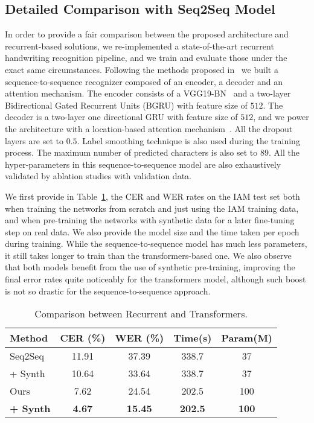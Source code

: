 \documentclass[10pt,twocolumn,letterpaper]{article}
\begin{document}
\subsection{Detailed Comparison with Seq2Seq Model}
\label{sec:adv_s2s}
In order to provide a fair comparison between the proposed architecture and recurrent-based solutions, we re-implemented a state-of-the-art recurrent handwriting recognition pipeline, and we train and evaluate those under the exact same circumstances. Following the methods proposed in~\cite{kang2018convolve,michael2019evaluating} we built a sequence-to-sequence recognizer composed of an encoder, a decoder and an attention mechanism. The encoder consists of a VGG19-BN~\cite{simonyan2014very} and a two-layer Bidirectional Gated Recurrent Units (BGRU) with feature size of $512$. The decoder is a two-layer one directional GRU with feature size of $512$, and we power the architecture with a location-based attention mechanism~\cite{chorowski2015attention}. All the dropout layers are set to $0.5$. Label smoothing technique is also used during the training process. The maximum number of predicted characters is also set to $89$. All the hyper-parameters in this sequence-to-sequence model are also exhaustively validated by ablation studies with validation data.

We first provide in Table~\ref{tab:comp}, the CER and WER rates on the IAM test set both when training the networks from scratch and just using the IAM training data, and when pre-training the networks with synthetic data for a later fine-tuning step on real data. We also provide the model size and the time taken per epoch during training. While the sequence-to-sequence model has much less parameters, it still takes longer to train than the transformers-based one. We also observe that both models benefit from the use of synthetic pre-training, improving the final error rates quite noticeably for the transformers model, although such boost is not so drastic for the sequence-to-sequence approach. 

\begin{table}[t!h]
    \caption{Comparison between Recurrent and Transformers.}
    \label{tab:comp}
    \centering
    \begin{tabular}{lcccc}
    \toprule
    Method & CER (\%) & WER (\%) & Time(s) & Param(M)\\
    \midrule
    Seq2Seq & 11.91 & 37.39 & 338.7 & 37\\
    + Synth & 10.64 & 33.64 & 338.7 & 37\\
    \midrule
    Ours & 7.62 & 24.54 & 202.5 & 100\\
    \textbf{+ Synth} & \textbf{4.67} & \textbf{15.45} & \textbf{202.5} & \textbf{100}\\
    \bottomrule
    \end{tabular}
\end{table}
\end{document}
